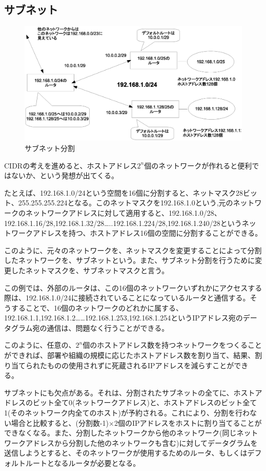 \subsection{サブネット}

\begin{figure}[htbp]
	\includegraphics[width=12cm,clip]{draw/subbne.eps}
	\caption{サブネット分割}
	\label{fig:subnet}
\end{figure}

CIDRの考えを進めると、ホストアドレス$2^{n}$個のネットワークが作れると便利ではないか、という発想が出てくる。

たとえば、192.168.1.0/24という空間を16個に分割すると、ネットマスク28ビット、255.255.255.224となる。このネットマスクを192.168.1.0という,元のネットワークのネットワークアドレスに対して適用すると、192.168.1.0/28、 192.168.1.16/28,192.168.1.32/28…..192.168.1.224/28,192.168.1.240/28というネットワークアドレスを持つ、ホストアドレス16個の空間に分割することができる。

このように、元々のネットワークを、ネットマスクを変更することによって分割したネットワークを、サブネットという。また、サブネット分割を行うために変更したネットマスクを、サブネットマスクと言う。

この例では、外部のルータは、この16個のネットワークいずれかにアクセスする際は、192.168.1.0/24に接続されていることになっているルータと通信する。そうすることで、16個のネットワークのどれかに属する、 192.168.1.1,192.168.1.2……192.168.1.253,192.168.1.254というIPアドレス宛のデータグラム宛の通信は、問題なく行うことができる。

このように、任意の、$2^n$個のホストアドレス数を持つネットワークをつくることができれば、部署や組織の規模に応じたホストアドレス数を割り当て、結果、割り当てられたものの使用されずに死蔵されるIPアドレスを減らすことができる。

サブネットにも欠点がある。それは、分割されたサブネットの全てに、ホストアドレスのビット全て0(ネットワークアドレス)と、ホストアドレスのビット全て1(そのネットワーク内全てのホスト)が予約される。これにより、分割を行わない場合と比較すると、(分割数-1)×2個のIPアドレスをホストに割り当てることができなくなる。また、分割したネットワークから他のネットワーク(同じネットワークアドレスから分割した他のネットワークも含む)に対してデータグラムを送信しようとすると、そのネットワークが使用するためのルータ、もしくはデフォルトルートとなるルータが必要となる。

